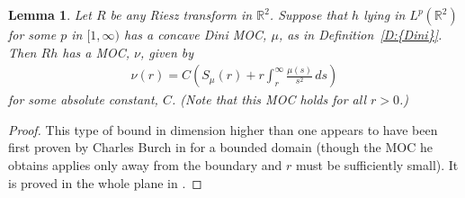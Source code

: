 \documentclass[reqno,openright,11pt,twoside]{amsart}
\newtheorem{lemma}[theorem]{Lemma}
\theoremstyle{definition}
\numberwithin{equation}{section}
\begin{document}
\begin{lemma}\label{L:ThreeRussians}
	Let $R$ be any Riesz transform in ${\ensuremath{{\ensuremath{\mathbb{{R}}}}}}^2$. Suppose that $h$
	lying in $L^p({\ensuremath{{\ensuremath{\mathbb{{R}}}}}}^2)$ for some $p$ in $[1, {\ensuremath{\infty}})$ has a concave
	Dini MOC, $\mu$, as in {Definition~\ref{D:{Dini}}}. Then
	$R h$ has a MOC, $\nu$, given by
	\begin{align}\label{e:nuMOC}
		\nu(r) = C {\ensuremath{\left( {S_\mu(r) + r \int_r^{\ensuremath{\infty}} \frac{\mu(s)}{s^2} \, ds} \right) }}
	\end{align}
	for some absolute constant, $C$. (Note that this MOC holds for all
	$r > 0$.)
\end{lemma}
\begin{proof}
	This type of bound in dimension higher than one appears to have been
	first proven by Charles Burch in \cite{Burch1978}
	for a bounded domain (though the MOC he obtains applies only away from
	the boundary
	and $r$ must be sufficiently small).
	It is proved in the whole plane in \cite{KNV2007}.
	{} 
\end{proof}

{} 
\end{document}
